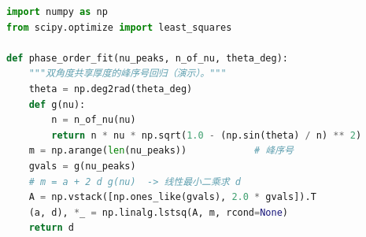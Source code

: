 \begin{lstlisting}[language=Python]
import numpy as np
from scipy.optimize import least_squares

def phase_order_fit(nu_peaks, n_of_nu, theta_deg):
    """双角度共享厚度的峰序号回归（演示）。"""
    theta = np.deg2rad(theta_deg)
    def g(nu):
        n = n_of_nu(nu)
        return n * nu * np.sqrt(1.0 - (np.sin(theta) / n) ** 2)
    m = np.arange(len(nu_peaks))            # 峰序号
    gvals = g(nu_peaks)
    # m = a + 2 d g(nu)  -> 线性最小二乘求 d
    A = np.vstack([np.ones_like(gvals), 2.0 * gvals]).T
    (a, d), *_ = np.linalg.lstsq(A, m, rcond=None)
    return d
\end{lstlisting}
